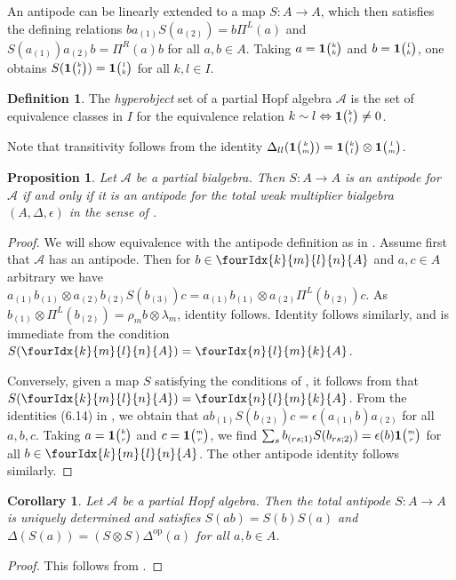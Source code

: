 \documentclass[10pt]{article}
\DeclareMathOperator{\op}{\mathrm{op}}
\newcommand{\Grt}[3]{#1{\tiny {\begin{pmatrix} #2\\#3\end{pmatrix}}}}
\newcommand{\UnitC}[2]{\Grt{\mathbf{1}}{#1}{#2}}
\newcommand{\Gr}[5]{\fourIdx{#2}{#4}{#3}{#5}{#1}}%
\newtheorem{Prop}[Theorem]{Proposition}
\newtheorem{Cor}[Theorem]{Corollary}
\theoremstyle{definition}
\newtheorem{Def}[Theorem]{Definition}
\numberwithin{equation}{section}
\begin{document}
An antipode can be linearly extended to a map $S: A\rightarrow A$, which then satisfies the defining relations $ba_{(1)}S(a_{(2)}) = b\Pi^{L}(a)$ and $S(a_{(1)})a_{(2)}b = \Pi^{R}(a)b$ for all $a,b\in A$. Taking $a= \UnitC{k}{k}$ and $b=\UnitC{l}{k}$, one obtains $S(\UnitC{k}{l}) = \UnitC{l}{k}$ for all $k,l\in I$.

\begin{Def} \label{remark:index-equivalence}
The \emph{hyperobject} set of a partial Hopf algebra $\mathscr{A}$ is the set of equivalence classes in $I$ for the equivalence relation $
    k \sim l \Leftrightarrow \UnitC{k}{l} \neq 0$.
\end{Def} 
Note that transitivity follows from the identity $\Delta_{ll}(\UnitC{k}{m}) = \UnitC{k}{l}\otimes \UnitC{l}{m}$.

\begin{Prop}  \label{theorem:partial-hopf-algebra}  Let $\mathscr{A}$ be a partial bialgebra. Then $S:A\rightarrow A$ is an antipode for $\mathscr{A}$ if and only if it is an antipode for the total weak multiplier bialgebra $(A,\Delta,\epsilon)$ in the sense of \cite[Section 6]{Boh1}.

\end{Prop}
\begin{proof} We will show equivalence with the antipode definition as in \cite[Theorem 6.8.(2)(vii)]{Boh1}. Assume first that $\mathscr{A}$ has an antipode. Then for $b\in \Gr{A}{k}{l}{m}{n}$ and $a,c\in A$ arbitrary we have $a_{(1)}b_{(1)} \otimes a_{(2)}b_{(2)}S(b_{(3)})c = a_{(1)}b_{(1)} \otimes a_{(2)}\Pi^L(b_{(2)})c$. As $b_{(1)}\otimes \Pi^L(b_{(2)}) = \rho_mb\otimes \lambda_m$, identity \cite[Theorem 6.8.(2)(vii)]{Boh1} follows. Identity \cite[Theorem 6.8.(2)(viii)]{Boh1} follows similarly, and \cite[Theorem 6.8.(2)(ix)]{Boh1} is immediate from the condition $S(\Gr{A}{k}{l}{m}{n}) = \Gr{A}{n}{m}{l}{k}$. 

Conversely, given a map $S$ satisfying the conditions of \cite[Theorem 6.8.(2)]{Boh1}, it follows from \cite[Lemma 6.14]{Boh1} that $S(\Gr{A}{k}{l}{m}{n}) = \Gr{A}{n}{m}{l}{k}$. From the identities (6.14) in \cite{Boh1}, we obtain that $ab_{(1)}S(b_{(2)})c = \epsilon(a_{(1)}b)a_{(2)}$ for all $a,b,c$. Taking $a=\UnitC{k}{r}$ and $c=\UnitC{m}{r}$, we find $\sum_s b_{(rs;1)}S(b_{rs;2)}) = \epsilon(b)\UnitC{m}{r}$ for all $b\in \Gr{A}{k}{l}{m}{n}$. The other antipode identity follows similarly.
\end{proof}

\begin{Cor} \label{corollary:antipode} Let $\mathscr{A}$ be a partial
  Hopf algebra. Then the total antipode $S:A\rightarrow A$ is uniquely determined and satisfies
  $S(ab) = S(b)S(a)$ and $\Delta(S(a)) = (S\otimes S)\Delta^{\op}(a)$
  for all $a,b\in A$.
\end{Cor} 
\begin{proof} This follows from \cite[Theorem 6.8, Theorem 6.12 and Corollary 6.16]{Boh1}. 
\end{proof} 
\end{document}
